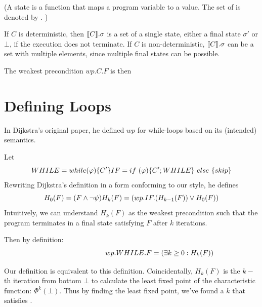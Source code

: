 (A state is a function that maps a program variable to a value. The set of  is denoted by . )

If $C$ is deterministic, then $\llbracket {C} \rrbracket.\sigma$ is a set of a single state, either a final state $\sigma'$ or $\bot$, if the execution does not terminate. 
If $C$ is non-deterministic, $\llbracket {C} \rrbracket.\sigma$ can be a set with multiple elements, since multiple final states can be possible. 

The weakest precondition $wp.C.F$ is then 


\section{Defining Loops}
In Dijkstra's original paper\cite{Dijkstra75}, he defined $wp$ for while-loops based on its (intended) semantics. 

Let 
\[
WHILE=while(\varphi)\{C'\}
\\ 
IF=  if\ (\varphi)\{C';WHILE\}\ else\ \{skip\}
\] 
Rewriting Dijkstra's definition in a form conforming to our style, he defines 
\[
H_0(F)=(F \wedge \neg \psi )
\\
H_k(F)=(wp.IF.(H_{k-1}(F)) \vee H_0(F))
\]
Intuitively, we can understand $H_k(F)$ as the weakest precondition such that the program terminates in a final state satisfying $F$ after  $k$ iterations. 

Then by definition: 
\begin{equation}
\hspace{2.8cm} wp.WHILE.F=(\exists k\geq 0: H_k(F))  \label{eq:while}
\end{equation}



Our definition is equivalent to this definition. 
Coincidentally, $H_k(F)$ is the $k-$th iteration from bottom $\bot$ to calculate the least fixed point of the characteristic function: $\Phi^k(\bot)$. 
Thus by finding the least fixed point, we've found a $k$ that satisfies . 

